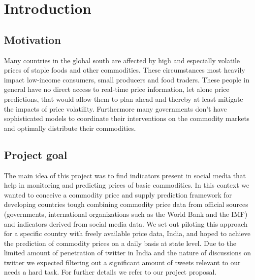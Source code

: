 \section*{Introduction}
\subsection*{Motivation}
Many countries in the global south are affected by high and especially volatile prices of staple foods and other commodities. These circumstances most heavily impact low-income consumers, small producers and food traders. These people in general have no direct access to real-time price information, let alone price predictions, that would allow them to plan ahead and thereby at least mitigate the impacts of price volatility. Furthermore many governments don’t have sophisticated models to coordinate their interventions on the commodity markets and optimally distribute their commodities.\\

\subsection*{Project goal}
The main idea of this project was to find indicators present in social media that help in monitoring and predicting prices of basic commodities. In this context we wanted to conceive a commodity price and supply prediction framework for developing countries tough combining commodity price data from official sources (governments, international organizations such as the World Bank and the IMF) and indicators derived from social media data. We set out piloting this approach for a specific country with freely available price data, India, and hoped to achieve the prediction of commodity prices on a daily basis at state level. Due to the limited amount of penetration of twitter in India and the nature of discussions on twitter we expected filtering out a significant amount of tweets relevant to our needs a hard task. For further details we refer to our project proposal.